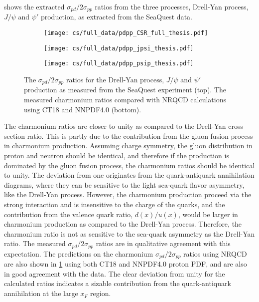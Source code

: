 \documentclass[../main.tex]{subfiles}
\begin{document}
 shows the extracted $\sigma_{pd}/2\sigma_{pp}$ ratios from the three processes,
Drell-Yan process, $J/\psi$ and $\psi'$ production, as extracted from the SeaQuest data.
\begin{figure}[h!]
	\centering
	\begin{subfigure}{0.8\linewidth}
		\texttt{[image: cs/full\_data/pdpp\_CSR\_full\_thesis.pdf]}
	\end{subfigure}
	\begin{subfigure}{0.48\linewidth}
		\texttt{[image: cs/full\_data/pdpp\_jpsi\_thesis.pdf]}
	\end{subfigure}
	\begin{subfigure}{0.48\linewidth}
		\texttt{[image: cs/full\_data/pdpp\_psip\_thesis.pdf]}
	\end{subfigure}
	\caption{The $\sigma_{pd}/2\sigma_{pp}$ ratios for the Drell-Yan process, $J/\psi$ and $\psi'$ production
		as measured from the SeaQuest experiment (top).
		The measured charmonium ratios compared with NRQCD calculations using CT18 and NNPDF4.0 (bottom).
	}
	\label{fig:csr_all_process}
\end{figure}
The charmonium ratios are closer to unity as compared to the Drell-Yan cross section ratio. This
is partly due to the contribution from the gluon fusion process in charmonium production. Assuming
charge symmetry, the gluon distribution in proton and neutron should be identical, and therefore
if the production is dominated by the gluon fusion process, the charmonium ratios should be identical
to unity. The deviation from one originates from the quark-antiquark annihilation diagrams, where they
can be sensitive to the light sea-quark flavor asymmetry, like the Drell-Yan process. However, the charmonium
production proceed via the strong interaction and is insensitive to the charge of the quarks, and
the contribution from the valence quark ratio, $d(x)/u(x)$, would be larger in charmonium production as compared to the Drell-Yan process.
Therefore, the charmonium ratio is not as sensitive to the sea-quark asymmetry as the Drell-Yan ratio.
The measured $\sigma_{pd}/2\sigma_{pp}$ ratios are in qualitative agreement with this expectation.
The predictions on the charmonium $\sigma_{pd}/2\sigma_{pp}$ ratios using NRQCD are also shown in
\cref{fig:csr_all_process} using both CT18 and NNPDF4.0 proton PDF, and are also in good agreement
with the data. The clear deviation from unity for the calculated ratios indicates a sizable
contribution from the quark-antiquark annihilation at the large $x_F$ region.
\FloatBarrier
\end{document}
